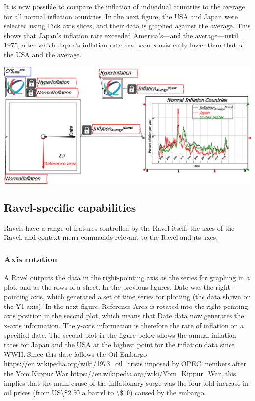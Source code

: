 It is now possible to compare the inflation of individual countries
to the average for all normal inflation countries. In the next figure,
the USA and Japan were selected using Pick axis slices, and their
data is graphed against the average. This shows that Japan's inflation
rate exceeded America's---and the average---until 1975, after which
Japan's inflation rate has been consistently lower than that of the
USA and the average.

\includegraphics[width=15cm]{images/CPI_SubsetsAverageVsSelection}

\subsection{Ravel-specific capabilities}

Ravels have a range of features controlled by the Ravel itself, the
axes of the Ravel, and context menu commands relevant to the Ravel
and its axes.

\subsubsection{Axis rotation}

A Ravel outputs the data in the right-pointing axis as the series
for graphing in a plot, and as the rows of a sheet. In the previous
figures, Date was the right-pointing axis, which generated a set of
time series for plotting (the data shown on the Y1 axis). In the next
figure, Reference Area is rotated into the right-pointing axis position
in the second plot, which means that Date data now generates the x-axis
information. The y-axis information is therefore the rate of inflation
on a specified date. The second plot in the figure below shows the
annual inflation rates for Japan and the USA at the highest point
for the inflation data since WWII. Since this date follows the Oil
Embargo \url{https://en.wikipedia.org/wiki/1973_oil_crisis} imposed
by OPEC members after the Yom Kippur War \url{https://en.wikipedia.org/wiki/Yom_Kippur_War},
this implies that the main cause of the inflationary surge was the
four-fold increase in oil prices (from US\textbackslash\$2.50 a
barrel to \textbackslash\$10) caused by the embargo.

